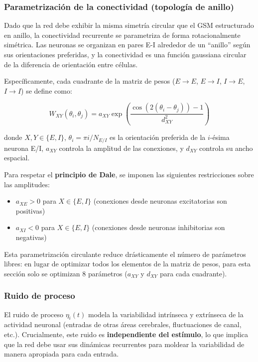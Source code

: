 \subsubsection{Parametrización de la conectividad (topología de anillo)}

Dado que la red debe exhibir la misma simetría circular que el GSM estructurado en anillo, la conectividad recurrente se parametriza de forma rotacionalmente simétrica. Las neuronas se organizan en pares E-I alrededor de un ``anillo'' según sus orientaciones preferidas, y la conectividad es una función gaussiana circular de la diferencia de orientación entre células.

Específicamente, cada cuadrante de la matriz de pesos ($E \rightarrow E$, $E \rightarrow I$, $I \rightarrow E$, $I \rightarrow I$) se define como:

\begin{equation}
W_{XY}(\theta_i, \theta_j) = a_{XY} \exp\left( \frac{\cos(2(\theta_i - \theta_j)) - 1}{d_{XY}^2} \right)
\label{eq:weight_parametrization}
\end{equation}

donde $X, Y \in \{E, I\}$, $\theta_i = \pi i / N_{E/I}$ es la orientación preferida de la $i$-ésima neurona E/I, $a_{XY}$ controla la amplitud de las conexiones, y $d_{XY}$ controla su ancho espacial.

Para respetar el \textbf{principio de Dale}, se imponen las siguientes restricciones sobre las amplitudes:
\begin{itemize}
    \item $a_{XE} > 0$ para $X \in \{E, I\}$ (conexiones desde neuronas excitatorias son positivas)
    \item $a_{XI} < 0$ para $X \in \{E, I\}$ (conexiones desde neuronas inhibitorias son negativas)
\end{itemize}

Esta parametrización circulante reduce drásticamente el número de parámetros libres: en lugar de optimizar todos los elementos de la matriz de pesos, para esta sección solo se optimizan 8 parámetros ($a_{XY}$ y $d_{XY}$ para cada cuadrante).

\subsubsection{Ruido de proceso}

El ruido de proceso $\eta_i(t)$ modela la variabilidad intrínseca y extrínseca de la actividad neuronal (entradas de otras áreas cerebrales, fluctuaciones de canal, etc.). Crucialmente, este ruido es \textbf{independiente del estímulo}, lo que implica que la red debe usar sus dinámicas recurrentes para moldear la variabilidad de manera apropiada para cada entrada.

